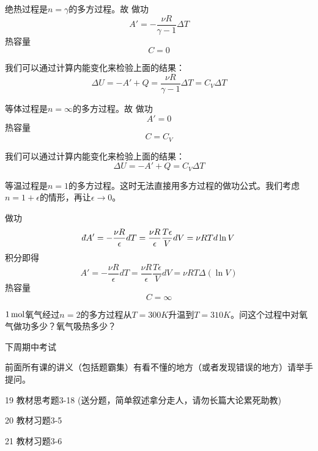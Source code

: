 \documentclass[CJK]{beamer}
\begin{document}
\begin{frame}
\bch
\bex
绝热过程是$n=\gamma$的多方过程。故
做功
$$A' = -\frac{\nu R}{\gamma-1}\Delta T$$
热容量
$$C = 0 $$

我们可以通过计算内能变化来检验上面的结果：
$$ \Delta U = -A' + Q = \frac{\nu R}{\gamma-1} \Delta T  =  C_V\Delta T$$

\eex
\ech
\end{frame}

\begin{frame}
\bch
\bex
等体过程是$n=\infty$的多方过程。故
做功
$$A' = 0$$
热容量
$$C = C_V $$

我们可以通过计算内能变化来检验上面的结果：
$$ \Delta U = -A' + Q =  C_V\Delta T$$

\eex
\ech
\end{frame}


\begin{frame}
\bch
\bex
等温过程是$n=1$的多方过程。这时无法直接用多方过程的做功公式。我们考虑$n=1+\epsilon$的情形，再让$\epsilon \rightarrow 0$。

做功
$$\dbar A' = -\frac{\nu R}{\epsilon}dT = \frac{\nu R}{\epsilon}\frac{T\epsilon}{V}dV = \nu RT d\ln V $$
积分即得
$$ A' = -\frac{\nu R}{\epsilon}dT = \frac{\nu R}{\epsilon}\frac{T\epsilon}{V}dV = \nu RT \Delta(\ln V) $$
热容量
$$C = \infty $$

\eex
\ech
\end{frame}


\begin{frame}
\bch
{}
$1\,\mathrm{mol}$氧气经过$n=2$的多方过程从$T=300K$升温到$T=310K$。问这个过程中对氧气做功多少？氧气吸热多少？
\ech
\end{frame}


\begin{frame}
\bch

下周期中考试


前面所有课的讲义（包括题霸集）有看不懂的地方（或者发现错误的地方）请举手提问。


\ech
\end{frame}


\begin{frame}
\bch
\bitem
\item[19]{教材思考题3-18 (送分题，简单叙述拿分走人，请勿长篇大论累死助教)}
\item[20]{教材习题3-5}
\item[21]{教材习题3-6}
\eitem
\ech
\end{frame}
\end{document}

